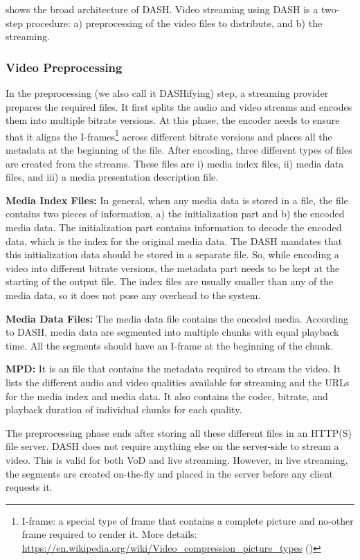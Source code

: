 \fig{\ref{fig:dash}} shows the broad architecture of \ac{DASH}. Video streaming using DASH is a two-step procedure: a) preprocessing of the video files to distribute, and b) the streaming. 


\subsubsection{Video Preprocessing}
In the preprocessing (we also call it DASHifying) step, a streaming provider prepares the required files. It first splits the audio and video streams and encodes them into multiple bitrate versions. At this phase, the encoder needs to ensure that it aligns the I-frames\footnote{I-frame: a special type of frame that contains a complete picture and no-other frame required to render it. More details: \url{https://en.wikipedia.org/wiki/Video_compression_picture_types} (\lastaccessedtoday)} across different bitrate versions and places all the metadata at the beginning of the file. After encoding, three different types of files are created from the streams. These files are i) media index files, ii) media data files, and iii) a media presentation description file.

{\bf Media Index Files:} In general, when any media data is stored in a file, the file contains two pieces of information, a) the initialization part and b) the encoded media data. The initialization part contains information to decode the encoded data, which is the index for the original media data. The \ac{DASH} mandates that this initialization data should be stored in a separate file. So, while encoding a video into different bitrate versions, the metadata part needs to be kept at the starting of the output file. The index files are usually smaller than any of the media data, so it does not pose any overhead to the system.

{\bf Media Data Files:} The media data file contains the encoded media. According to \ac{DASH}, media data are segmented into multiple chunks with equal playback time. All the segments should have an I-frame at the beginning of the chunk.

{\bf \ac{MPD}:} It is an {\tt {}} file that contains the metadata required to stream the video. It lists the different audio and video qualities available for streaming and the \acsp{URL} for the media index and media data. It also contains the codec, bitrate, and playback duration of individual chunks for each quality.

The preprocessing phase ends after storing all these different files in an \ac{HTTP(S)} file server. DASH does not require anything else on the server-side to stream a video. This is valid for both \ac{VoD} and live streaming. However, in live streaming, the segments are created on-the-fly and placed in the server before any client requests it.

